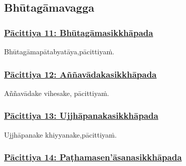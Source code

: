 \subsection{Bhūtagāmavagga}

\subsubsection*{\hyperref[exp11]{Pācittiya 11: Bhūtagāmasikkhāpada}}
\label{pac11}

Bhūtagāmapātabyatāya,\makeatletter\hyperlink{endnote237-appendix}\makeatother \thinspace pācittiyaṁ.



\subsubsection*{\hyperref[exp12]{Pācittiya 12: Aññavādakasikkhāpada}}
\label{pac12}

Aññavādake vihesake, pācittiyaṁ.



\subsubsection*{\hyperref[exp13]{Pācittiya 13: Ujjhāpanakasikkhāpada}}
\label{pac13}

Ujjhāpanake khiyyanake,\makeatletter\hyperlink{endnote238-appendix}\makeatother \thinspace pācittiyaṁ.



\subsubsection*{\hyperref[exp14]{Pācittiya 14: Paṭhamasen'āsanasikkhāpada}}
\label{pac14}

